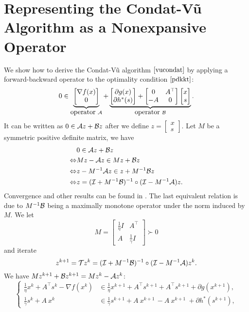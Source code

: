 \section{Representing the Condat-V\~{u} Algorithm as a Nonexpansive Operator}\label{sec:vc-op}
We show how to derive the Condat-V\~{u} algorithm $\eqref{vucondat}$ by applying a forward-backward operator to the optimality condition $\eqref{pdkkt}$:
\begin{equation}
0\in\underbrace{\begin{bmatrix}
\nabla f(x)\\
0
\end{bmatrix}}_{\mbox{operator}~\cA}+\underbrace{
\begin{bmatrix}
\partial g(x)\\
\partial h^*(s)
\end{bmatrix}+\begin{bmatrix}
0&A^\top\\
-A&0
\end{bmatrix}\begin{bmatrix}
x\\
s
\end{bmatrix}}_{\mbox{operator}~\cB}.
\end{equation} 
It can be written as $0\in{\mathcal{A}} z+{\mathcal{B}} z$ after we define $z=\begin{bmatrix}x\\ s\end{bmatrix}$. Let $M$ be a symmetric positive definite matrix, we have
\begin{align*}
&0\in\cA z+\cB z\\
\Leftrightarrow& Mz-\cA z \in Mz+\cB z\\
\Leftrightarrow& z-M^{-1}\cA z \in z+M^{-1}\cB z\\
\Leftrightarrow& z=(\cI+M^{-1}\cB)^{-1}\circ(\cI-M^{-1}\cA)z.
\end{align*}
Convergence and other results can be found in \cite{davis2014convergence}. The last equivalent relation is due to $M^{-1}{\mathcal{B}}$ being a maximally monotone operator under the norm induced by $M$. We let $$M=\begin{bmatrix}
\frac{1}{\eta}I&A^\top\\
A&\frac{1}{\gamma}I
\end{bmatrix}\succ 0$$
and iterate $$z^{k+1}={\mathcal{T}} z^k=({\mathcal{I}}+M^{-1}{\mathcal{B}})^{-1}\circ({\mathcal{I}}-M^{-1}{\mathcal{A}})z^k.$$
We have $Mz^{k+1}+{{\mathcal{B}}}z^{k+1}= Mz^k-{\mathcal{A}} z^k$:
$$\left\{\begin{array}{ll}
\frac{1}{\eta}x^k  +A^\top s^{k}- \nabla f(x^k)&\in \frac{1}{\eta}x^{k+1} + A^\top s^{k+1}+A^\top s^{k+1}+\partial g (x^{k+1}),\\ 
\frac{1}{\gamma}s^k + A~ x^{k~}&\in \frac{1}{\gamma}s^{k+1}+ A~ x^{k+1~} -A ~x^{k+1} ~+\partial h^*(s^{k+1}),
\end{array}\right.$$
